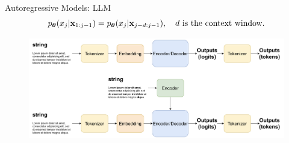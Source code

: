 \documentclass{beamer}
\begin{document}
\begin{frame}{Autoregressive Models: LLM}
	\[
		p_{\boldsymbol{\theta}}(x_j | \mathbf{x}_{1:j - 1}) = p_{\boldsymbol{\theta}}(x_j | \mathbf{x}_{j - d:j - 1}),\quad d\ \text{is the context window}.
	\]
	 \begin{figure}
		   \centering
		   \includegraphics[width=1.0\linewidth]{figs/llm_modeling}
	 \end{figure}
\end{frame}
\end{document}

